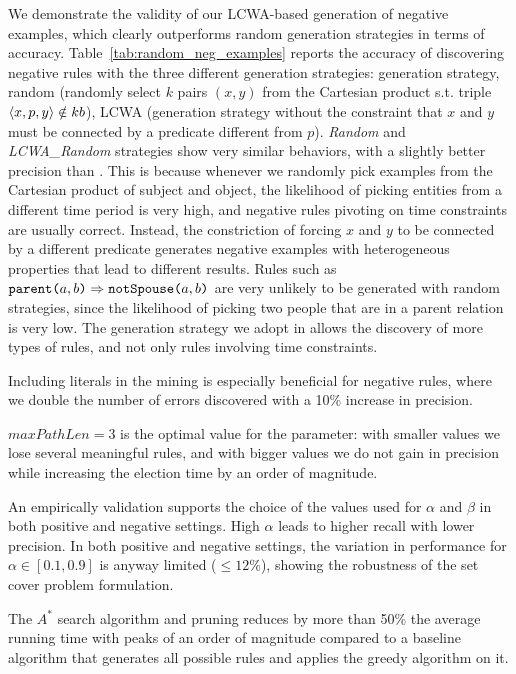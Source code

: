 \noindent {} We demonstrate the validity of our LCWA-based generation of negative examples, which clearly outperforms random generation strategies in terms of accuracy.
Table~\ref{tab:random_neg_examples} reports the accuracy of discovering negative rules with the three different generation strategies: \krd generation strategy, random (randomly select $k$ pairs $(x,y)$ from the Cartesian product s.t. triple $\langle x,p,y\rangle \notin {\sc kb}$), LCWA (\krd generation strategy without the constraint that $x$ and $y$ must be connected by a predicate different from $p$).
\emph{Random} and \emph{LCWA\_Random} strategies show very similar behaviors, with a slightly better precision than \krd. This is because whenever we randomly pick examples from the Cartesian product of subject and object, the likelihood of picking entities from a different time period is very high, and negative rules pivoting on time constraints are usually correct. Instead, the constriction of forcing $x$ and $y$ to be connected by a different predicate generates  negative examples with heterogeneous properties that lead to different results. Rules such as $\texttt{parent(}a,b\texttt{)} \Rightarrow  \texttt{notSpouse(}a,b\texttt{)}$ are very unlikely to be generated with random strategies, since the likelihood of picking two people that are in a parent relation is very low. The generation strategy we adopt in \krd allows the discovery of more types of rules, and not only rules involving time constraints. 


\noindent {} Including literals in the mining is especially beneficial for negative rules, where we double the number of errors discovered with a 10\% increase in precision.

\noindent {} $maxPathLen=3$ is the optimal value for the parameter: with smaller values we lose several meaningful rules, and with bigger values we do not gain in precision while increasing the election time by an order of magnitude. %

\noindent {} An empirically validation supports the choice of the values used for $\alpha$ and $\beta$ in both positive and negative settings. High $\alpha$ leads to higher recall with lower precision. In both positive and negative settings, the variation in performance for $\alpha \in [0.1,0.9]$ is anyway limited ($\leq 12\%$), showing the robustness of the set cover problem formulation.

\noindent {} The $A^*$ search algorithm and pruning reduces by more than 50\% the average running time with peaks of an order of magnitude compared to a baseline algorithm that generates all possible rules and applies the greedy algorithm on it.

